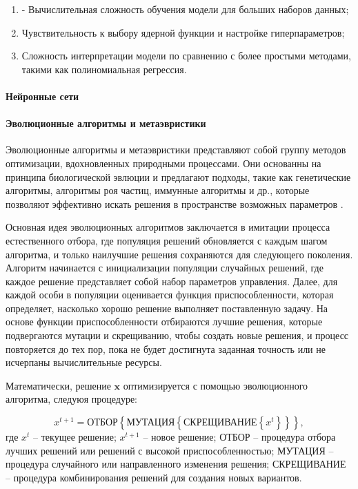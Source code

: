 \begin{enumerate}
    \item - Вычислительная сложность обучения модели для больших наборов данных;
    \item Чувствительность к выбору ядерной функции и настройке гиперпараметров;
    \item Сложность интерпретации модели по сравнению с более простыми методами, такими как полиномиальная регрессия.
\end{enumerate}

\paragraph{Нейронные сети}\label{sec:ch4/sec3/subsec1/subsubsec5}

\paragraph{Эволюционные алгоритмы и метаэвристики}\label{sec:ch4/sec3/subsec1/subsubsec6}
Эволюционные алгоритмы и метаэвристики представляют собой группу методов оптимизации,
вдохновленных природными процессами.
Они основанны на принципа биологической эвлюции и предлагают подходы, такие как генетические алгоритмы,
алгоритмы роя частиц, иммунные алгоритмы и др., которые позволяют эффективно искать решения
в пространстве возможных параметров \cite{zhang2015comparision}.

Основная идея эволюционных алгоритмов заключается в имитации процесса естественного отбора,
где популяция решений обновляется с каждым шагом алгоритма, и только наилучшие решения
сохраняются для следующего поколения. Алгоритм начинается с инициализации популяции случайных
решений, где каждое решение представляет собой набор параметров управления. Далее, для каждой
особи в популяции оценивается функция приспособленности, которая определяет, насколько хорошо
решение выполняет поставленную задачу. На основе функции приспособленности отбираются лучшие
решения, которые подвергаются мутации и скрещиванию, чтобы создать новые решения, и процесс
повторяется до тех пор, пока не будет достигнута заданная точность или не исчерпаны
вычислительные ресурсы.

Математически, решение $\mathbf{x}$ оптимизируется с помощью эволюционного алгоритма, следуюя
процедуре:

\begin{equation*}
    x^{t+1} = \text{ОТБОР} \left\{
    \text{МУТАЦИЯ} \left\{
    \text{СКРЕЩИВАНИЕ} \left\{
    x^t
    \right\}
    \right\}
    \right\},
\end{equation*}
где $x^t$ -- текущее решение;
$x^{t+1}$ -- новое решение;
$\text{ОТБОР}$ -- процедура отбора лучших решений или решений с высокой приспособленностью;
$\text{МУТАЦИЯ}$ -- процедура случайного или направленного изменения решения;
$\text{СКРЕЩИВАНИЕ}$ -- процедура комбинирования решений для создания новых вариантов.

